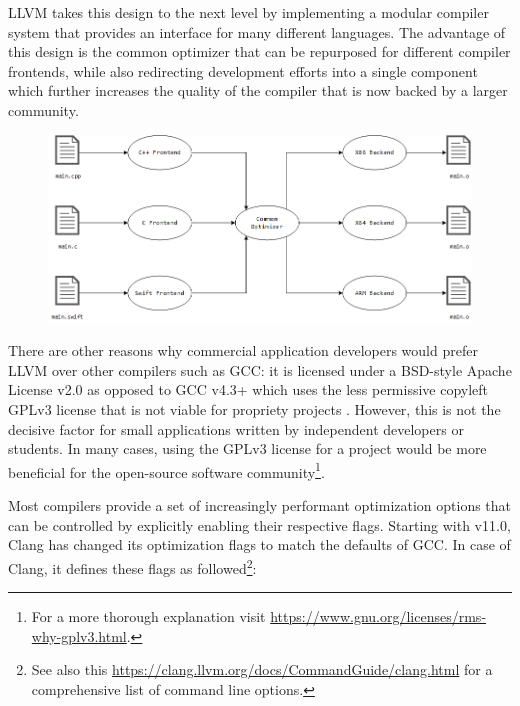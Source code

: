 LLVM takes this design to the next level by implementing a modular compiler system
that provides an interface for many different languages. The advantage of this design
is the common optimizer that can be repurposed for different compiler frontends,
while also redirecting development efforts into a single component which further
increases the quality of the compiler that is now backed by a larger community.

\begin{figure}[hbt!]
    \centering
    \includegraphics[width=1\textwidth]{images/ThreePhaseDesignRetargeting.png}
\end{figure}

There are other reasons why commercial application developers would prefer LLVM
over other compilers such as GCC: it is licensed under a BSD-style Apache License
v2.0 as opposed to GCC v4.3+ which uses the less permissive copyleft GPLv3 license
that is not viable for propriety projects \autocite{fandrey2010}. However, this is
not the decisive factor for small applications written by independent developers
or students. In many cases, using the GPLv3 license for a project would be more
beneficial for the open-source software community\footnote{For a more thorough
explanation visit \url{https://www.gnu.org/licenses/rms-why-gplv3.html}.}.

Most compilers provide a set of increasingly performant optimization options that
can be controlled by explicitly enabling their respective flags. Starting with v11.0,
Clang has changed its optimization flags to match the defaults of GCC. In case of
Clang, it defines these flags as followed\footnote{See also this \url{https://clang.llvm.org/docs/CommandGuide/clang.html}
for a comprehensive list of command line options.}:

